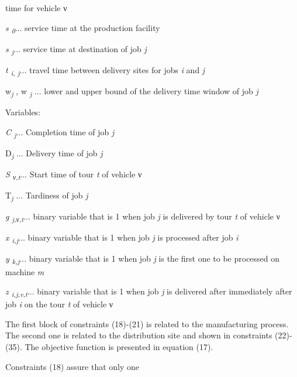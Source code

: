  time for vehicle ν\par \textit{s \textsubscript{0}}... service time at the production facility\par \textit{s \textsubscript{j}}... service time at destination of job
 \textit{j}\par \textit{t \textsubscript{i, j}}... travel time between delivery sites for jobs
 \textit{i} and \textit{j}\par w\textit{\textsubscript{j}} , w \textit{\textsubscript{j }}... lower and upper bound of the delivery time window of job
 \textit{j}\par Variables:\par \textit{C \textsubscript{j}}... Completion time of job \textit{j}\par D\textit{\textsubscript{j }}... Delivery time of job \textit{j}\par \textit{S \textsubscript{ν,t}}... Start time of tour \textit{t} of
 vehicle ν\par T\textit{\textsubscript{j }}... Tardiness of job \textit{j}\par \textit{g \textsubscript{j,ν,t}}... binary variable that is 1 when job \textit{j
 } is delivered by tour \textit{t} of vehicle ν\par \textit{x \textsubscript{i,j}}... binary variable that is 1 when job \textit{j
 } is processed after job \textit{i}\par \textit{y \textsubscript{k,j}}... binary variable that is 1 when job \textit{j
 } is the first one to be processed on machine \textit{m}\par \textit{z \textsubscript{i,j,v,t}}... binary variable that is 1 when job
 \textit{j} is delivered after immediately after job \textit{i} on
 the tour \textit{t} of vehicle ν\par The first block of constraints (18)-(21) is related to the
 manufacturing process. The second one is related to the distribution site and shown
 in constraints (22)-(35). The objective function is presented
 in equation (17).\par Constraints (18) assure that only one
